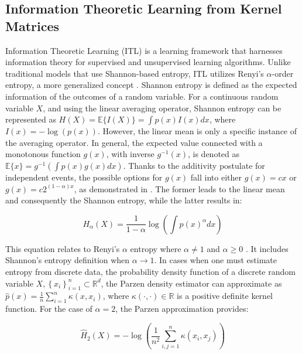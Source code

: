 \subsection{Information Theoretic Learning from Kernel Matrices}
Information Theoretic Learning (ITL) is a learning framework that harnesses information theory for supervised and unsupervised learning algorithms. Unlike traditional models that use Shannon-based entropy, ITL utilizes Renyi's $\alpha$-order entropy, a more generalized concept \cite{li2020fast}. Shannon entropy is defined as the expected information of the outcomes of a random variable. For a continuous random variable $X$, and using the linear averaging operator, Shannon entropy can be represented as $H(X)=\mathbb{E}\{I(X)\}=\int p(x) I(x) d x$, where $I(x)=-\log (p(x))$. However, the linear mean is only a specific instance of the averaging operator. In general, the expected value connected with a monotonous function $g(x)$, with inverse $g^{-1}(x)$, is denoted as $\mathbb{E}\{x\}=g^{-1}\left(\int p(x) g(x) d x\right)$. Thanks to the additivity postulate for independent events, the possible options for $g(x)$ fall into either $g(x)=c x$ or $g(x)=c 2^{(1-\alpha) x}$, as demonstrated in \cite{renyi1961measures}. The former leads to the linear mean and consequently the Shannon entropy, while the latter results in:

\begin{equation}\label{eq:renyiint}
    H_{\alpha}(X)=\frac{1}{1-\alpha} \log \left(\int p(x)^{\alpha} d x\right) 
\end{equation}

This equation relates to Renyi's $\alpha$ entropy where $\alpha \neq 1$ and $\alpha \geq 0$ \cite{principe2010information,renyi1961measures}. It includes Shannon's entropy definition when $\alpha \rightarrow 1$. In cases when one must estimate entropy from discrete data, the probability density function of a discrete random variable $X,\left\{x_{i}\right\}_{i=1}^{n} \subset \mathbb{R}^{d}$, the Parzen density estimator can approximate as $\hat{p}(x)=\frac{1}{n} \sum_{i=1}^{n} \kappa\left(x, x_{i}\right)$, where $\kappa(\cdot, \cdot) \in \mathbb{R}$ is a positive definite kernel function. For the case of $\alpha=2$, the Parzen approximation provides:

\begin{equation}\label{eq:renyisum}
    \hat{H}_{2}(X)=-\log \left(\frac{1}{n^{2}} \sum_{i, j=1}^{n} \kappa\left(x_{i}, x_{j}\right)\right)
\end{equation}

